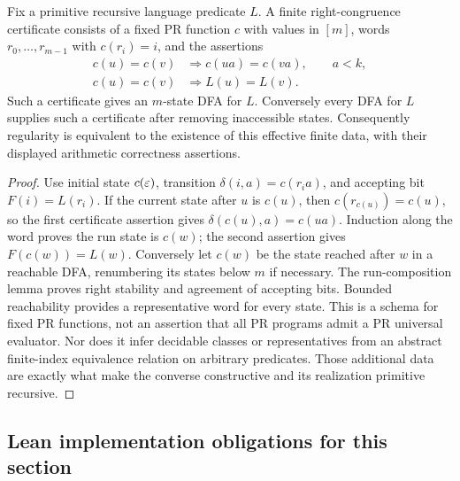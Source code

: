 \begin{theorem}\label{reg:nerode}
Fix a primitive recursive language predicate $L$.  A finite right-congruence
certificate consists of a fixed PR function $c$ with values in $[m]$,
words $r_0,\ldots,r_{m-1}$ with $c(r_i)=i$, and the assertions
\[
\begin{split}
 c(u)=c(v)&\Longrightarrow c(ua)=c(va),\qquad a<k,\\
 c(u)=c(v)&\Longrightarrow L(u)=L(v).
\end{split}
\]
Such a certificate gives an $m$-state DFA for $L$.  Conversely every DFA
for $L$ supplies such a certificate after removing inaccessible states.
Consequently regularity is equivalent to the existence of this effective
finite data, with their displayed arithmetic correctness assertions.
\end{theorem}
\begin{proof}
Use initial state $c(\varepsilon)$, transition
$\delta(i,a)=c(r_i a)$, and accepting bit $F(i)=L(r_i)$.
If the current state after $u$ is $c(u)$, then $c(r_{c(u)})=c(u)$,
so the first certificate assertion gives
$\delta(c(u),a)=c(ua)$.  Induction along the word proves the run state
is $c(w)$; the second assertion gives $F(c(w))=L(w)$.
Conversely let $c(w)$ be the state reached after $w$ in a reachable DFA,
renumbering its states below $m$ if necessary.  The run-composition lemma
proves right stability and agreement of accepting bits.  Bounded
reachability provides a representative word for every state.
This is a schema for fixed PR functions, not an assertion that all PR
programs admit a PR universal evaluator.  Nor does it infer decidable
classes or representatives from an abstract finite-index equivalence
relation on arbitrary predicates.  Those additional data are exactly
what make the converse constructive and its realization primitive
recursive.
\end{proof}

\subsection{Lean implementation obligations for this section}
\label{reg:lean}

